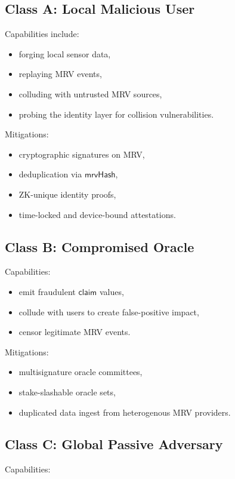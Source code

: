 \documentclass[11pt,a4paper]{report}
\theoremstyle{definition}
\theoremstyle{remark}
\begin{document}
\subsection{Class A: Local Malicious User}
Capabilities include:

\begin{itemize}[leftmargin=*]
  \item forging local sensor data,
  \item replaying MRV events,
  \item colluding with untrusted MRV sources,
  \item probing the identity layer for collision vulnerabilities.
\end{itemize}

Mitigations:
\begin{itemize}[leftmargin=*]
  \item cryptographic signatures on MRV,
  \item deduplication via $\mathsf{mrvHash}$,
  \item ZK-unique identity proofs,
  \item time-locked and device-bound attestations.
\end{itemize}

\subsection{Class B: Compromised Oracle}
Capabilities:

\begin{itemize}[leftmargin=*]
  \item emit fraudulent $\mathsf{claim}$ values,
  \item collude with users to create false-positive impact,
  \item censor legitimate MRV events.
\end{itemize}

Mitigations:
\begin{itemize}[leftmargin=*]
  \item multisignature oracle committees,
  \item stake-slashable oracle sets,
  \item duplicated data ingest from heterogenous MRV providers.
\end{itemize}

\subsection{Class C: Global Passive Adversary}
Capabilities:
\end{document}
